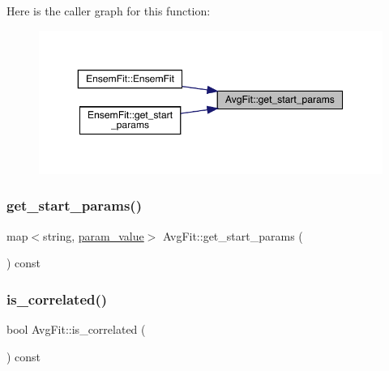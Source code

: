 Here is the caller graph for this function\+:
\nopagebreak
\begin{figure}[H]
\begin{center}
\leavevmode
\includegraphics[width=350pt]{d4/dfd/classAvgFit_a7823eaaddd8f06848f2c092886076d0d_icgraph}
\end{center}
\end{figure}
\mbox{\label{classAvgFit_a7823eaaddd8f06848f2c092886076d0d}} 
\subsubsection{\texorpdfstring{get\_start\_params()}{get\_start\_params()}\hspace{0.1cm}{\footnotesize\ttfamily [2/2]}}
{\footnotesize\ttfamily map$<$string, \mbox{\hyperlink{structparam__value}{param\+\_\+value}}$>$ Avg\+Fit\+::get\+\_\+start\+\_\+params (\begin{DoxyParamCaption}{ }\end{DoxyParamCaption}) const\hspace{0.3cm}{\ttfamily [inline]}}

\mbox{\label{classAvgFit_af828c76e39fea9326e2828e176abb1c4}} 
\subsubsection{\texorpdfstring{is\_correlated()}{is\_correlated()}\hspace{0.1cm}{\footnotesize\ttfamily [1/2]}}
{\footnotesize\ttfamily bool Avg\+Fit\+::is\+\_\+correlated (\begin{DoxyParamCaption}{ }\end{DoxyParamCaption}) const\hspace{0.3cm}{\ttfamily [inline]}}


